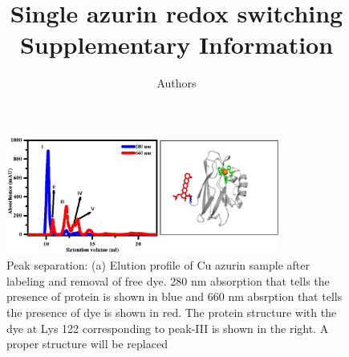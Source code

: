 \documentclass[11pt,a4paper,onecolumn]{article}
\newcommand*{\affaddr}[1]{#1} %
\newcommand*{\email}[1]{\texttt{#1}} %
\begin{document}
\author{Authors
}

\date{\vspace{1ex}} %

\title{\textbf{Single azurin redox switching}\\ \vspace{3ex} Supplementary Information \vspace{3ex}}

\maketitle
\tableofcontents
\pagebreak
\begin{figure}
  \centering
  \includegraphics[width=0.8\textwidth]{peak_separation.eps}
  \makeatletter
  \renewcommand{\fnum@figure}{\figurename~S\thefigure}
  \makeatother
  \caption{Peak separation: (a) Elution profile of Cu azurin sample after labeling and removal of free dye. 280 nm absorption that tells the presence of protein is shown in blue and 660 nm absrption that tells the presence of dye is shown in red. The protein structure with the dye at Lys 122 corresponding to peak-III is shown in the right. {A proper structure will be replaced}}
  \label{SIfig: peak_sep}
\end{figure}
\end{document}

